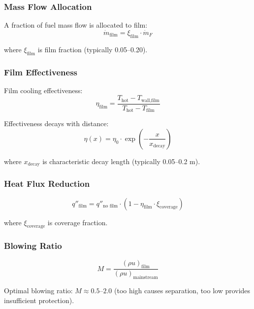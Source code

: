 \documentclass[12pt,a4paper]{article}
\newcommand{\mdot}{\dot{m}}
\begin{document}
\subsubsection{Mass Flow Allocation}

A fraction of fuel mass flow is allocated to film:
\begin{equation}
\mdot_{\text{film}} = \xi_{\text{film}} \cdot \mdot_F
\end{equation}

where $\xi_{\text{film}}$ is film fraction (typically 0.05--0.20).

\subsubsection{Film Effectiveness}

Film cooling effectiveness:
\begin{equation}
\eta_{\text{film}} = \frac{T_{\text{hot}} - T_{\text{wall,film}}}{T_{\text{hot}} - T_{\text{film}}}
\end{equation}

Effectiveness decays with distance:
\begin{equation}
\eta(x) = \eta_0 \cdot \exp\left(-\frac{x}{x_{\text{decay}}}\right)
\end{equation}

where $x_{\text{decay}}$ is characteristic decay length (typically 0.05--0.2 m).

\subsubsection{Heat Flux Reduction}

\begin{equation}
q''_{\text{film}} = q''_{\text{no film}} \cdot (1 - \eta_{\text{film}} \cdot \xi_{\text{coverage}})
\end{equation}

where $\xi_{\text{coverage}}$ is coverage fraction.

\subsubsection{Blowing Ratio}

\begin{equation}
M = \frac{(\rho u)_{\text{film}}}{(\rho u)_{\text{mainstream}}}
\end{equation}

Optimal blowing ratio: $M \approx 0.5$--$2.0$ (too high causes separation, too low provides insufficient protection).
\end{document}
